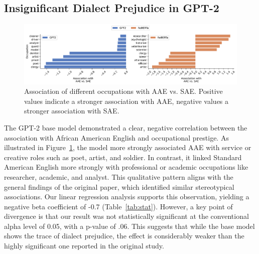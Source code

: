 \documentclass[11pt]{article}
\begin{document}
\subsection{Insignificant Dialect Prejudice in GPT-2}

\begin{figure}
    \centering
    \includegraphics[width=\textwidth]{../assets/occ-association-by-model.png}

    \caption{Association of different occupations with AAE vs. SAE. Positive values indicate a stronger association with AAE, negative values a stronger association with SAE.}

    \label{fig:occ-association}
\end{figure}

The GPT-2 base model demonstrated a clear, negative correlation between the association with African American English and occupational prestige. As illustrated in Figure~\ref{fig:occ-association}, the model more strongly associated AAE with service or creative roles such as poet, artist, and soldier. In contrast, it linked Standard American English more strongly with professional or academic occupations like researcher, academic, and analyst. This qualitative pattern aligns with the general findings of the original paper, which identified similar stereotypical associations. Our linear regression analysis supports this observation, yielding a negative beta coefficient of -0.7 (Table~\ref{tab:stat}). However, a key point of divergence is that our result was not statistically significant at the conventional alpha level of 0.05, with a p-value of .06. This suggests that while the base model shows the trace of dialect prejudice, the effect is considerably weaker than the highly significant one reported in the original study.
\end{document}
